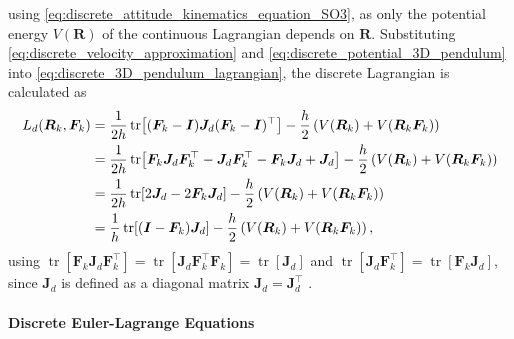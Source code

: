 using \eqref{eq:discrete_attitude_kinematics_equation_SO3}, as only the potential energy $V(\bm{R})$ of the continuous Lagrangian depends on $\bm{R}$. Substituting \eqref{eq:discrete_velocity_approximation} and \eqref{eq:discrete_potential_3D_pendulum} into \eqref{eq:discrete_3D_pendulum_lagrangian}, the discrete Lagrangian is calculated as
\begin{align}\label{eq:discrete_3d_pendulum_discrete_lagrangian_full}
    L_d(\bm{R}_k,\bm{F}_k)
    &=
    \frac{1}{2h}\operatorname{tr}\!\left[(\bm{F}_k-\bm{I})\bm{J}_d(\bm{F}_k-\bm{I})^{\top}\right]
    - \frac{h}{2}\left(V(\bm{R}_k)+V(\bm{R}_k\bm{F}_k)\right)  \notag\\
    &=
    \frac{1}{2h}\operatorname{tr}\!\left[
        \bm{F}_k\bm{J}_d\bm{F}_k^{\top}
        - \bm{J}_d\bm{F}_k^{\top}
        - \bm{F}_k\bm{J}_d
        + \bm{J}_d
    \right]
    - \frac{h}{2}\left(V(\bm{R}_k)+V(\bm{R}_k\bm{F}_k)\right) \notag \\
    &=
    \frac{1}{2h}\operatorname{tr}\!\left[
        2\bm{J}_d - 2\bm{F}_k\bm{J}_d
    \right]
    - \frac{h}{2}\left(V(\bm{R}_k)+V(\bm{R}_k\bm{F}_k)\right) \notag \\
    &=
    \frac{1}{h}\operatorname{tr}\!\left[(\bm{I}-\bm{F}_k)\bm{J}_d\right]
    - \frac{h}{2}\left(V(\bm{R}_k)+V(\bm{R}_k\bm{F}_k)\right),
\end{align}
using $\operatorname{tr}[\bm{F}_k \bm{J}_d \bm{F}_k^\top] = \operatorname{tr}[\bm{J}_d \bm{F}_k^\top \bm{F}_k ] = \operatorname{tr}[\bm{J}_d]$ and $\operatorname{tr}[\bm{J}_d \bm{F}_k^\top] = \operatorname{tr}[\bm{F}_k \bm{J}_d]$, since $\bm{J}_d$ is defined as a diagonal matrix $\bm{J}_d = \bm{J}_d^\top$ \cite{Lee2008}.

\paragraph{Discrete Euler-Lagrange Equations}

